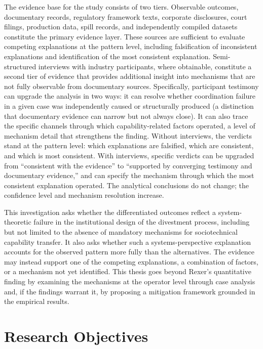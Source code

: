 \documentclass[twoside,fontset=lmodern]{mitthesis}
\begin{document}
The evidence base for the study consists of two tiers. Observable
outcomes, documentary records, regulatory framework texts, corporate
disclosures, court filings, production data, spill records, and
independently compiled datasets constitute the primary evidence layer.
These sources are sufficient to evaluate competing explanations at the
pattern level, including falsification of inconsistent explanations and
identification of the most consistent explanation. Semi-structured
interviews with industry participants, where obtainable, constitute a
second tier of evidence that provides additional insight into mechanisms
that are not fully observable from documentary sources. Specifically,
participant testimony can upgrade the analysis in two ways: it can
resolve whether coordination failure in a given case was independently
caused or structurally produced (a distinction that documentary evidence
can narrow but not always close). It can also trace the specific
channels through which capability-related factors operated, a level of
mechanism detail that strengthens the finding. Without interviews, the
verdicts stand at the pattern level: which explanations are falsified,
which are consistent, and which is most consistent. With interviews,
specific verdicts can be upgraded from ``consistent with the evidence''
to ``supported by converging testimony and documentary evidence,'' and
can specify the mechanism through which the most consistent explanation
operated. The analytical conclusions do not change; the confidence level
and mechanism resolution increase.

This investigation asks whether the differentiated outcomes reflect a
system-theoretic failure in the institutional design of the divestment
process, including but not limited to the absence of mandatory
mechanisms for sociotechnical capability transfer. It also asks whether
such a systems-perspective explanation accounts for the observed pattern
more fully than the alternatives. The evidence may instead support one
of the competing explanations, a combination of factors, or a mechanism
not yet identified. This thesis goes beyond Rexer's quantitative finding
by examining the mechanisms at the operator level through case analysis
and, if the findings warrant it, by proposing a mitigation framework
grounded in the empirical results.

\hypertarget{research-objectives}{%
\section{Research Objectives}\label{research-objectives}}
\end{document}
